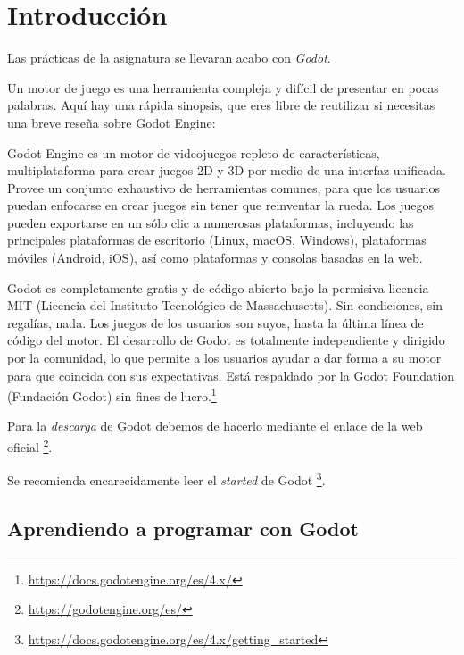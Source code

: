 \documentclass[12pt]{report} %
\begin{document}
\hypertarget{introducciuxf3n-1}{%
\chapter{Introducción}\label{introducciuxf3n-1}}

Las prácticas de la asignatura se llevaran acabo con \emph{Godot}.

Un motor de juego es una herramienta compleja y difícil de presentar en
pocas palabras. Aquí hay una rápida sinopsis, que eres libre de
reutilizar si necesitas una breve reseña sobre Godot Engine:

Godot Engine es un motor de videojuegos repleto de características,
multiplataforma para crear juegos 2D y 3D por medio de una interfaz
unificada. Provee un conjunto exhaustivo de herramientas comunes, para
que los usuarios puedan enfocarse en crear juegos sin tener que
reinventar la rueda. Los juegos pueden exportarse en un sólo clic a
numerosas plataformas, incluyendo las principales plataformas de
escritorio (Linux, macOS, Windows), plataformas móviles (Android, iOS),
así como plataformas y consolas basadas en la web.

Godot es completamente gratis y de código abierto bajo la permisiva
licencia MIT (Licencia del Instituto Tecnológico de Massachusetts). Sin
condiciones, sin regalías, nada. Los juegos de los usuarios son suyos,
hasta la última línea de código del motor. El desarrollo de Godot es
totalmente independiente y dirigido por la comunidad, lo que permite a
los usuarios ayudar a dar forma a su motor para que coincida con sus
expectativas. Está respaldado por la Godot Foundation (Fundación Godot)
sin fines de lucro.\footnote{\url{https://docs.godotengine.org/es/4.x/}}

Para la \emph{descarga} de Godot debemos de hacerlo mediante el enlace
de la web oficial \footnote{\url{https://godotengine.org/es/}}.


Se recomienda encarecidamente leer el \emph{started} de Godot
\footnote{\url{https://docs.godotengine.org/es/4.x/getting_started}}.

\hypertarget{aprendiendo-a-programar-con-godot}{%
\section{Aprendiendo a programar con
Godot}\label{aprendiendo-a-programar-con-godot}}
\end{document}
